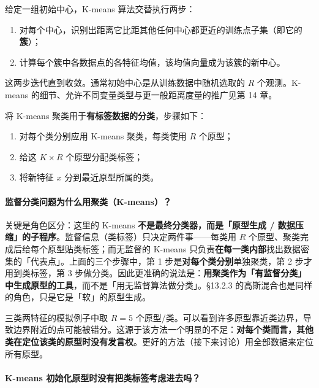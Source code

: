 给定一组初始中心，K-means 算法交替执行两步：

\begin{enumerate}[itemsep=1pt]
\item 对每个中心，识别出距离它比距其他任何中心都更近的训练点子集（即它的\textbf{簇}）；
\item 计算每个簇中各数据点的各特征均值，该均值向量成为该簇的新中心。
\end{enumerate}

这两步迭代直到收敛。通常初始中心是从训练数据中随机选取的 $R$ 个观测。K-means 的细节、允许不同变量类型与更一般距离度量的推广见第 14 章。

将 K-means 聚类用于\textbf{有标签数据的分类}，步骤如下：

\begin{enumerate}[itemsep=1pt]
\item 对每个类分别应用 K-means 聚类，每类使用 $R$ 个原型；
\item 给这 $K\times R$ 个原型分配类标签；
\item 将新特征 $x$ 分到最近原型所属的类。
\end{enumerate}

\paragraph{监督分类问题为什么用聚类（K-means）？}

关键是角色区分：这里的 K-means \textbf{不是最终分类器，而是「原型生成 / 数据压缩」的子程序}。监督信息（类标签）只决定两件事——每类用 $R$ 个原型、聚类完成后给每个原型贴类标签；而无监督的 K-means 只负责\textbf{在每一类内部}找出数据密集的「代表点」。上面的三个步骤中，第 1 步是\textbf{对每个类分别}单独聚类，第 2 步才用到类标签，第 3 步做分类。因此更准确的说法是：\textbf{用聚类作为「有监督分类」中生成原型的工具}，而不是「用无监督算法做分类」。§13.2.3 的高斯混合也是同样的角色，只是它是「软」的原型生成。

\begin{remark}
三类两特征的模拟例子中取 $R=5$ 个原型/类。可以看到许多原型靠近类边界，导致边界附近的点可能被错分。这源于该方法一个明显的不足：\textbf{对每个类而言，其他类在定位该类的原型时没有发言权}。更好的方法（接下来讨论）用全部数据来定位所有原型。
\end{remark}

\paragraph{K-means 初始化原型时没有把类标签考虑进去吗？}

